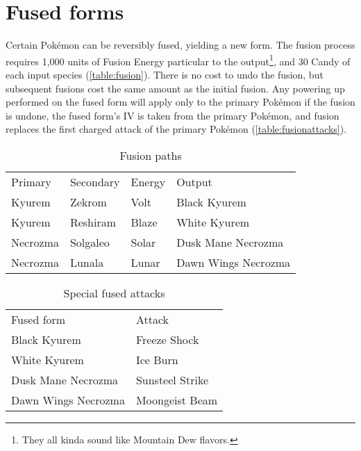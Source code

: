 \section{Fused forms}
\label{sec:fusion}
Certain Pokémon can be reversibly fused, yielding a new form.
The fusion process requires 1,000 units of Fusion Energy particular to the output\footnote{They all kinda sound like Mountain Dew flavors.},
 and 30 Candy of each input species (\autoref{table:fusion}).
There is no cost to undo the fusion, but subsequent fusions cost the same amount as the initial fusion.
Any powering up performed on the fused form will apply only to the primary
  Pokémon if the fusion is undone, the fused form's IV is taken from the primary Pokémon,
  and fusion replaces the first charged attack of the primary Pokémon (\autoref{table:fusionattacks}).
\begin{table}
\centering
\begin{tabular}{llll}
  Primary & Secondary & Energy & Output\\
\Midrule
  Kyurem & Zekrom & Volt & Black Kyurem \\
  Kyurem & Reshiram & Blaze & White Kyurem \\
  Necrozma & Solgaleo & Solar & Dusk Mane Necrozma \\
  Necrozma & Lunala & Lunar & Dawn Wings Necrozma \\
\end{tabular}
  \caption{Fusion paths}
  \label{table:fusion}
\end{table}
\begin{table}
\centering
\begin{tabular}{ll}
  Fused form & Attack\\
\Midrule
  Black Kyurem & Freeze Shock \\
  White Kyurem & Ice Burn\\
  Dusk Mane Necrozma & Sunsteel Strike\\
  Dawn Wings Necrozma & Moongeist Beam\\
\end{tabular}
  \caption{Special fused attacks}
  \label{table:fusionattacks}
\end{table}


